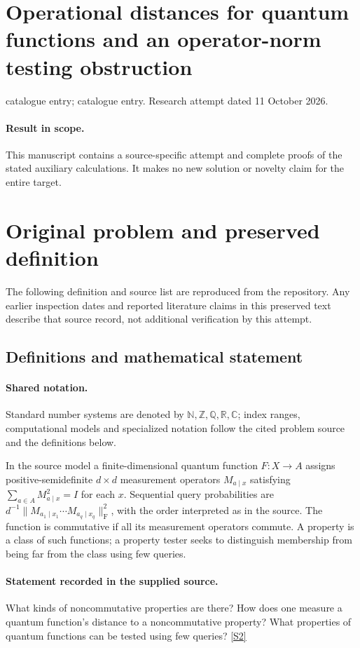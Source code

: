 \documentclass[11pt]{article}
\begin{document}
\section*{Operational distances for quantum functions and an operator-norm testing obstruction}
\noindent catalogue entry; catalogue entry. Research attempt dated 11 October 2026.
\paragraph{Result in scope.}This manuscript contains a source-specific attempt and complete proofs of the stated auxiliary calculations. It makes no new solution or novelty claim for the entire target.
\section{Original problem and preserved definition}
The following definition and source list are reproduced from the repository. Any earlier inspection dates and reported literature claims in this preserved text describe that source record, not additional verification by this attempt.
\subsection{Definitions and mathematical statement}

\paragraph{Shared notation.}Standard number systems are denoted by $\mathbb N,\mathbb Z,\mathbb Q,\mathbb R,\mathbb C$; index ranges, computational models and specialized notation follow the cited problem source and the definitions below.


In the source model a finite-dimensional quantum function $F:X\to A$ assigns positive-semidefinite $d\times d$ measurement operators $M_{a\mid x}$ satisfying $\sum_{a\in A}M_{a\mid x}^2=I$ for each $x$. Sequential query probabilities are $d^{-1}\|M_{a_1\mid x_1}\cdots M_{a_q\mid x_q}\|_{\mathrm F}^2$, with the order interpreted as in the source. The function is commutative if all its measurement operators commute. A property is a class of such functions; a property tester seeks to distinguish membership from being far from the class using few queries.
\paragraph{Statement recorded in the supplied source.}
What kinds of noncommutative properties are there? How does one measure a quantum function’s distance to a noncommutative property? What properties of quantum functions can be tested using few queries? \href{https://doi.org/10.4171/owr/2021/54}{[S2]}
\end{document}
